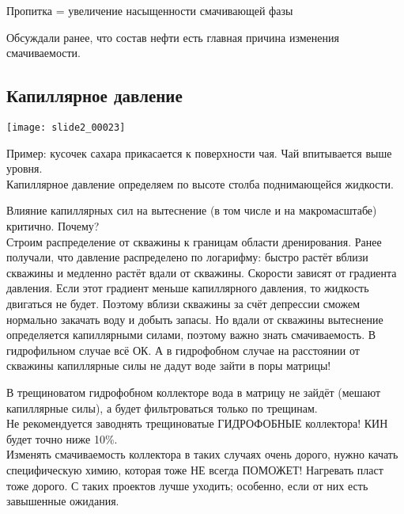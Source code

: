 \documentclass[main.tex]{subfiles}
\begin{document}
Пропитка = увеличение насыщенности смачивающей фазы


Обсуждали ранее, что состав нефти есть главная причина изменения смачиваемости. 


\subsection{Капиллярное давление}

\texttt{[image: slide2\_00023]}

Пример: кусочек сахара прикасается к поверхности чая. Чай впитывается выше уровня.\\

Капиллярное давление определяем по высоте столба поднимающейся жидкости.



Влияние капиллярных сил на вытеснение (в том числе и на макромасштабе) критично. Почему?\\

Строим распределение от скважины к границам области дренирования. Ранее получали, что давление распределено по логарифму: быстро растёт вблизи скважины и медленно растёт вдали от скважины. Скорости зависят от градиента давления. Если этот градиент меньше капиллярного давления, то жидкость двигаться не будет. Поэтому вблизи скважины за счёт депрессии сможем нормально закачать воду и добыть запасы. Но вдали от скважины вытеснение определяется капиллярными силами, поэтому важно знать смачиваемость. В гидрофильном случае всё ОК. А в гидрофобном случае на расстоянии от скважины капиллярные силы не дадут воде зайти в поры матрицы!


В трещиноватом гидрофобном коллекторе вода в матрицу не зайдёт (мешают капиллярные силы), а будет фильтроваться только по трещинам.\\

Не рекомендуется заводнять трещиноватые ГИДРОФОБНЫЕ коллектора! КИН будет точно ниже 10\%.\\

Изменять смачиваемость коллектора в таких случаях очень дорого, нужно качать специфическую химию, которая тоже НЕ всегда ПОМОЖЕТ! Нагревать пласт тоже дорого. С таких проектов лучше уходить; особенно, если от них есть завышенные ожидания.
\end{document}
